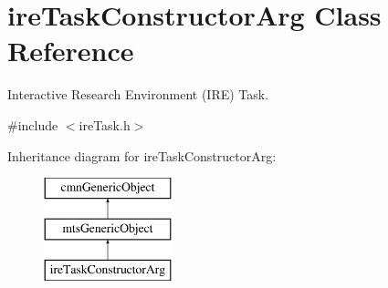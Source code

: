 \hypertarget{classire_task_constructor_arg}{\section{ire\-Task\-Constructor\-Arg Class Reference}
\label{classire_task_constructor_arg}
}


Interactive Research Environment (I\-R\-E) Task.  




{\ttfamily \#include $<$ire\-Task.\-h$>$}

Inheritance diagram for ire\-Task\-Constructor\-Arg\-:\begin{figure}[H]
\begin{center}
\leavevmode
\includegraphics[height=3.000000cm]{d3/d00/classire_task_constructor_arg}
\end{center}
\end{figure}
